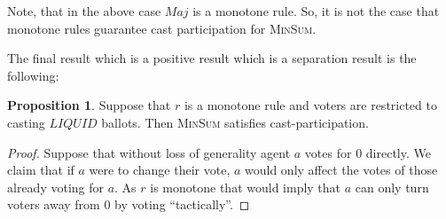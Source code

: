\documentclass[11pt,a4paper, titlepage]{article}
\theoremstyle{definition}
\newtheorem{proposition}[theorem]{Proposition}
\newcommand{\LIQUID}{\mathit{LIQUID}}
\begin{document}
Note, that in the above case $\mathit{Maj}$ is a monotone rule. So, it is not the case that monotone rules guarantee cast participation for \textsc{MinSum}.

The final result which is a positive result which is a separation result is the following:

\begin{proposition}
    Suppose that $r$ is a monotone rule and voters are restricted to casting $\LIQUID$ ballots. Then \textsc{MinSum} satisfies cast-participation.
\end{proposition}

\begin{proof}
    Suppose that without loss of generality agent $a$ votes for $0$ directly.
    We claim that if $a$ were to change their vote, $a$ would only affect the votes of those already voting for $a$. As $r$ is monotone that would imply that $a$ can only turn voters away from $0$ by voting ``tactically''.

\end{proof}


\newpage


\end{document}
